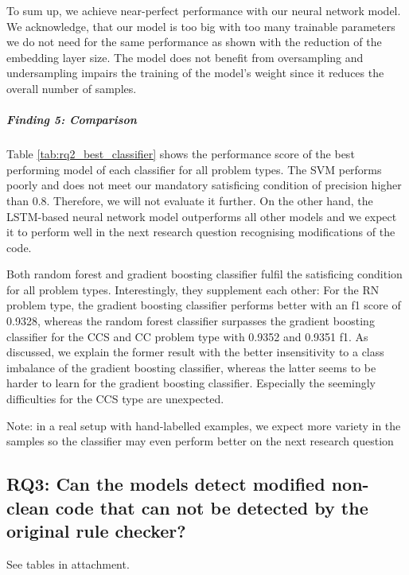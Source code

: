 To sum up, we achieve near-perfect performance with our neural network model. We acknowledge, that our model is too big with too many trainable parameters we do not need for the same performance as shown with the reduction of the embedding layer size. The model does not benefit from oversampling and undersampling impairs the training of the model's weight since it reduces the overall number of samples.

\subparagraph{Finding 5: Comparison}

 Table \ref{tab:rq2_best_classifier} shows the performance score of the best performing model of each classifier for all problem types.
 The SVM performs poorly and does not meet our mandatory satisficing condition of precision higher than 0.8. Therefore, we will not evaluate it further. On the other hand, the LSTM-based neural network model outperforms all other models and we expect it to perform well in the next research question recognising modifications of the code.

 Both random forest and gradient boosting classifier fulfil the satisficing condition for all problem types. Interestingly, they supplement each other: For the RN problem type, the gradient boosting classifier performs better with an f1 score of 0.9328, whereas the random forest classifier surpasses the gradient boosting classifier for the CCS and CC problem type with 0.9352 and 0.9351 f1. As discussed, we explain the former result with the better insensitivity to a class imbalance of the gradient boosting classifier, whereas the latter seems to be harder to learn for the gradient boosting classifier. Especially the seemingly difficulties for the CCS type are unexpected.
 
 Note: in a real setup with hand-labelled examples, we expect more variety in the samples so the classifier may even perform better on the next research question 


 \subsection{RQ3: Can the models detect modified non-clean code that can not be detected by the original rule checker? }
See tables in attachment.

